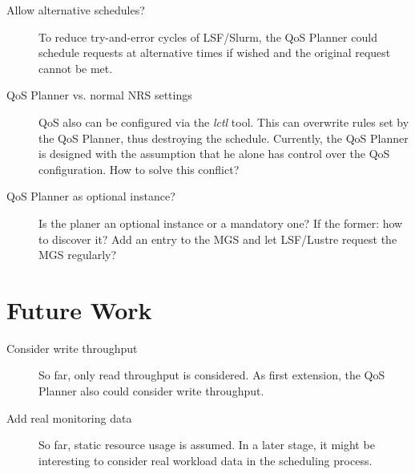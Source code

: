 \documentclass[10pt]{article}
\begin{document}
\begin{description}
 \item[Allow alternative schedules?] To reduce try-and-error cycles of LSF/Slurm, the QoS Planner could schedule requests at alternative times if wished and the original request cannot be met.

 \item[QoS Planner vs. normal NRS settings] QoS also can be configured via the \emph{lctl} tool.
 This can overwrite rules set by the QoS Planner, thus destroying the schedule.
 Currently, the QoS Planner is designed with the assumption that he alone has control over the QoS configuration.
 How to solve this conflict?

 \item[QoS Planner as optional instance?] Is the planer an optional instance or a mandatory one?
 If the former: how to discover it?
 Add an entry to the MGS and let LSF/Lustre request the MGS regularly?
\end{description}


\section{Future Work}

\begin{description}
 \item[Consider write throughput] So far, only read throughput is considered. As first extension, the QoS Planner also could consider write throughput.
 \item[Add real monitoring data] So far, static resource usage is assumed. In a later stage, it might be interesting to consider real workload data in the scheduling process.
\end{description}
\end{document}
